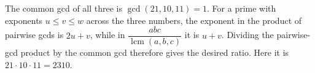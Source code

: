 The common gcd of all three is $\gcd(21,10,11)=1$. For a prime with exponents $u\le v\le w$ across the three numbers, the exponent in the product of pairwise gcds is $2u+v$, while in $\dfrac{abc}{\operatorname{lcm}(a,b,c)}$ it is $u+v$. Dividing the pairwise-gcd product by the common gcd therefore gives the desired ratio. Here it is $21\cdot10\cdot11=\boxed{2310}$.
